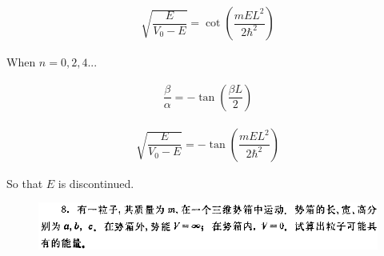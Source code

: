 \documentclass{article}
\begin{document}
\begin{equation*}
  \begin{aligned}
    \sqrt{\dfrac{E}{V_0 - E} } = \cot \left( \dfrac{m E L^2}{2 \hbar^2}  \right)
  \end{aligned}
\end{equation*}

When $n = 0,2,4...$

\begin{equation*}
  \begin{aligned}
    \dfrac{\beta}{\alpha} = - \tan \left(\dfrac{\beta L}{2}   \right) 
  \end{aligned}
\end{equation*}

\begin{equation*}
  \begin{aligned}
    \sqrt{\dfrac{E}{V_0 - E} } = - \tan \left( \dfrac{m E L^2}{2 \hbar^2}  \right)
  \end{aligned}
\end{equation*}

So that $E$ is discontinued.

\begin{figure}[H]
  \centering
  \includegraphics[width=\linewidth]{figures/8}
  \label{fig:}
\end{figure}
\end{document}
